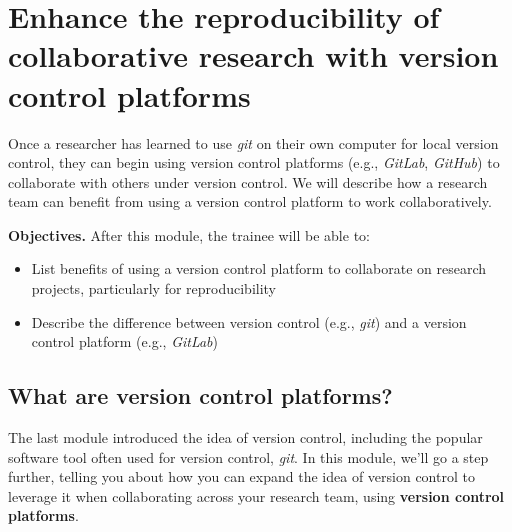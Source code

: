 \documentclass[]{tufte-book}
\providecommand{\tightlist}{%
  \setlength{\itemsep}{0pt}\setlength{\parskip}{0pt}}
\begin{document}
\hypertarget{module10}{%
\section{Enhance the reproducibility of collaborative research with version control platforms}\label{module10}}

Once a researcher has learned to use \emph{git} on their own computer for
local version control, they can begin using version control platforms (e.g.,
\emph{GitLab}, \emph{GitHub}) to collaborate with others under version
control. We will describe how a research team can benefit from using a version
control platform to work collaboratively.

\textbf{Objectives.} After this module, the trainee will be able to:

\begin{itemize}
\tightlist
\item
  List benefits of using a version control platform to collaborate
  on research projects, particularly for reproducibility
\item
  Describe the difference between version control (e.g., \emph{git}) and
  a version control platform (e.g., \emph{GitLab})
\end{itemize}

\hypertarget{what-are-version-control-platforms}{%
\subsection{What are version control platforms?}\label{what-are-version-control-platforms}}

The last module introduced the idea of version control, including the
popular software tool often used for version control, \emph{git}. In this
module, we'll go a step further, telling you about how you can expand
the idea of version control to leverage it when collaborating across
your research team, using \textbf{version control platforms}.
\end{document}
